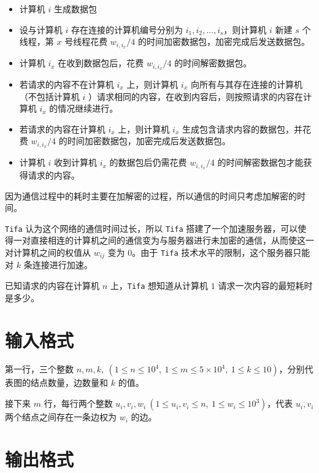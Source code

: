 \documentclass{ctpro}
\begin{document}
\begin{itemize}
    \item 计算机 $i$ 生成数据包
    \item 设与计算机 $i$ 存在连接的计算机编号分别为 $i_1,i_2,...,i_s$，则计算机 $i$ 新建 $s$ 个线程，第 $x$ 号线程花费 $w_{i,i_x}/4$ 的时间加密数据包，加密完成后发送数据包。
    \item 计算机 $i_x$ 在收到数据包后，花费 $w_{i,i_x}/4$ 的时间解密数据包。
    \item 若请求的内容不在计算机 $i_x$ 上，则计算机 $i_x$ 向所有与其存在连接的计算机（不包括计算机 $i$ ）请求相同的内容，在收到内容后，则按照请求的内容在计算机 $i_x$ 的情况继续进行。
    \item 若请求的内容在计算机 $i_x$ 上，则计算机 $i_x$ 生成包含请求内容的数据包，并花费 $w_{i,i_x}/4$ 的时间加密数据包，加密完成后发送数据包。
    \item 计算机 $i$ 收到计算机 $i_x$ 的数据包后仍需花费 $w_{i,i_x}/4$ 的时间解密数据包才能获得请求的内容。
\end{itemize}

因为通信过程中的耗时主要在加解密的过程，所以通信的时间只考虑加解密的时间。


\verb|Tifa| 认为这个网络的通信时间过长，所以 \verb|Tifa| 搭建了一个加速服务器，可以使得一对直接相连的计算机之间的通信变为与服务器进行未加密的通信，从而使这一对计算机之间的权值从 $w_{ij}$ 变为 $0$。由于 \verb|Tifa| 技术水平的限制，这个服务器只能对 $k$ 条连接进行加速。

已知请求的内容在计算机 $n$ 上，\verb|Tifa| 想知道从计算机 $1$ 请求一次内容的最短耗时是多少。

\section*{输入格式}

第一行，三个整数 $n,m,k,~(1 \leq n \leq {10}^4,~1 \leq m \leq 5 \times {10}^4,~1 \leq k \leq 10)$，分别代表图的结点数量，边数量和 $k$ 的值。

接下来 $m$ 行，每行两个整数 $u_i,v_i,w_i~(1 \leq u_i,v_i \leq n,~1 \leq w_i \leq {10}^3)$，代表 $u_i,v_i$ 两个结点之间存在一条边权为 $w_i$ 的边。

\section*{输出格式}
\end{document}
